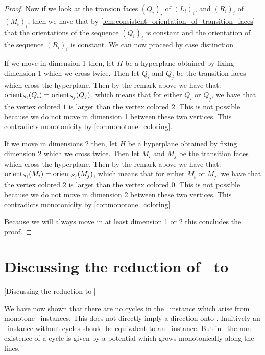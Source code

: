 \begin{proof}
	Now if we look at the transion faces $\left(Q_i\right)_i$ of $\left(L_i \right)_i$, and $\left(R_i\right)_i$ of $\left(M_i\right)_i$, then we have that by \cref{lem:consistent_orientation_of_transition_faces} that the orientations of the sequence $\left(Q_i\right)_i$ is constant and the orientation of the sequence $\left(R_i\right)_i$ is constant. We can now proceed by case distinction
	\begin{case}{1}
		If we move in dimension 1 then, let $H$ be a hyperplane obtained by fixing dimension 1 which we cross twice. Then let $Q_i$ and $Q_j$ be the transition faces which cross the hyperplane. Then by the remark above we have that: $\operatorname{orient}_{S_i}(Q_i) = \operatorname{orient}_{S_j}(Q_j)$, which means that for either $Q_i$ or $Q_j$, we have that the vertex colored $1$ is larger than the vertex colored $2$. This is not possible because we do not move in dimension 1 between these two vertices. This contradicts monotonicity by \cref{cor:monotone_coloring}.
	\end{case}
	\begin{case}{2}
		If we move in dimensions 2 then, let $H$ be a hyperplane obtained by fixing dimension 2 which we cross twice. Then let $M_i$ and $M_j$ be the transition faces which cross the hyperplane. Then by the remark above we have that: $\operatorname{orient}_{S_i}(M_i) = \operatorname{orient}_{S_j}(M_j)$, which means that for either $M_i$ or $M_j$, we have that the vertex colored $2$ is larger than the vertex colored $0$. This is not possible because we do not move in dimension 2 between these two vertices. This contradicts monotonicity by \cref{cor:monotone_coloring}
	\end{case}
	Because we will always move in at least dimension 1 or 2 this concludes the proof.
\end{proof}

\section{Discussing the reduction of \Tarskistar\ to \EndOfPotentialLine}[Discussing the reduction to \EOPL]

We have now shown that there are no cycles in the \EndOfLine\ instance which arise from monotone \Tarskistar\ instances. This does not directly imply a direction onto \EndOfPotentialLine. Inuitively an \EndOfLine\ instance without cycles should be equivalent to an \EndOfPotentialLine\ instance. But in \EndOfPotentialLine\ the non-existence of a cycle is given by a potential which grows monotonically along the lines.

